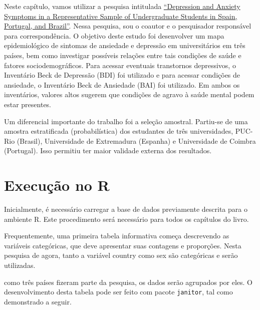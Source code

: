 \documentclass[
]{book}
\newenvironment{Shaded}{\begin{snugshade}}{\end{snugshade}}
\newcommand{\KeywordTok}[1]{\textcolor[rgb]{0.13,0.29,0.53}{\textbf{#1}}}
\newcommand{\NormalTok}[1]{#1}
\newcommand{\OperatorTok}[1]{\textcolor[rgb]{0.81,0.36,0.00}{\textbf{#1}}}
\newcommand{\StringTok}[1]{\textcolor[rgb]{0.31,0.60,0.02}{#1}}
\begin{document}
Neste capítulo, vamos utilizar a pesquisa intitulada
\href{https://doi.org/10.1590/0102.3772e36412}{``Depression and Anxiety
Symptoms in a Representative Sample of Undergraduate Students in Spain,
Portugal, and Brazil''}. Nessa pesquisa, sou o coautor e o pesquisador
responsável para correspondência. O objetivo deste estudo foi
desenvolver um mapa epidemiológico de sintomas de ansiedade e depressão
em universitários em três países, bem como investigar possíveis relações
entre tais condições de saúde e fatores sociodemográficos. Para acessar
eventuais transtornos depressivos, o Inventário Beck de Depressão (BDI)
foi utilizado e para acessar condições de ansiedade, o Inventário Beck
de Ansiedade (BAI) foi utilizado. Em ambos os inventários, valores altos
sugerem que condições de agravo à saúde mental podem estar presentes.

Um diferencial importante do trabalho foi a seleção amostral. Partiu-se
de uma amostra estratificada (probabilística) dos estudantes de três
universidades, PUC-Rio (Brasil), Universidade de Extremadura (Espanha) e
Universidade de Coimbra (Portugal). Isso permitiu ter maior validade
externa dos resultados.

\hypertarget{execuuxe7uxe3o-no-r}{%
\section{Execução no R}\label{execuuxe7uxe3o-no-r}}

Inicialmente, é necessário carregar a base de dados previamente descrita
para o ambiente R. Este procedimento será necessário para todos os
capítulos do livro.

Frequentemente, uma primeira tabela informativa começa descrevendo as
variáveis categóricas, que deve apresentar suas contagens e proporções.
Nesta pesquisa de agora, tanto a variável country como sex são
categóricas e serão utilizadas.

como três países fizeram parte da pesquisa, os dados serão agrupados por
eles. O desenvolvimento desta tabela pode ser feito com pacote
\texttt{janitor}, tal como demonstrado a seguir.

\begin{Shaded}
\end{Shaded}
\end{document}
